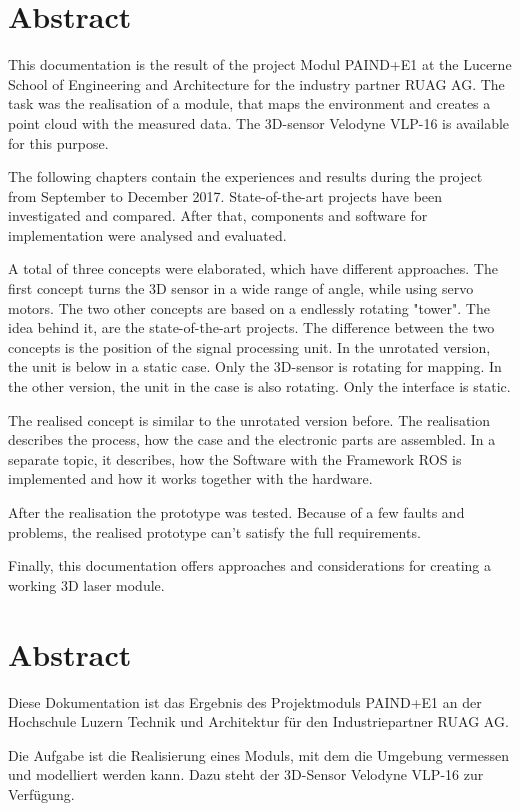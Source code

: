 \chapter*{Abstract}
\label{chap:Abstract}
This documentation is the result of the project Modul PAIND+E1 at the Lucerne School of Engineering and Architecture for the industry partner RUAG AG. The task was the realisation of a module, that maps the environment and creates a point cloud with the measured data. The 3D-sensor Velodyne VLP-16 is available for this purpose.

The following chapters contain the experiences and results during the project from September to December 2017. State-of-the-art projects have been investigated and compared. After that, components and software for implementation were analysed and evaluated.

A total of three concepts were elaborated, which have different approaches. The first concept turns the 3D sensor in a wide range of angle, while using servo motors. The two other concepts are based on a endlessly rotating "tower". The idea behind it, are the state-of-the-art projects. The difference between the two concepts is the position of the signal processing unit. In the unrotated version, the unit is below in a static case. Only the 3D-sensor is rotating for mapping. In the other version, the unit in the case is also rotating. Only the interface is static. 

The realised concept is similar to the unrotated version before. The realisation describes the process, how the case and the electronic parts are assembled. In a separate topic, it describes, how the Software with the Framework ROS is implemented and how it works together with the hardware. 

After the realisation the prototype was tested. Because of a few faults and problems, the realised prototype can't satisfy the full requirements.

Finally, this documentation offers approaches and considerations for creating a working 3D laser module.

\chapter*{Abstract}

Diese Dokumentation ist das Ergebnis des Projektmoduls PAIND+E1 an der Hochschule Luzern Technik und Architektur für den Industriepartner RUAG AG.

Die Aufgabe ist die Realisierung eines Moduls, mit dem die Umgebung vermessen und modelliert werden kann. Dazu steht der 3D-Sensor Velodyne VLP-16 zur Verfügung.

